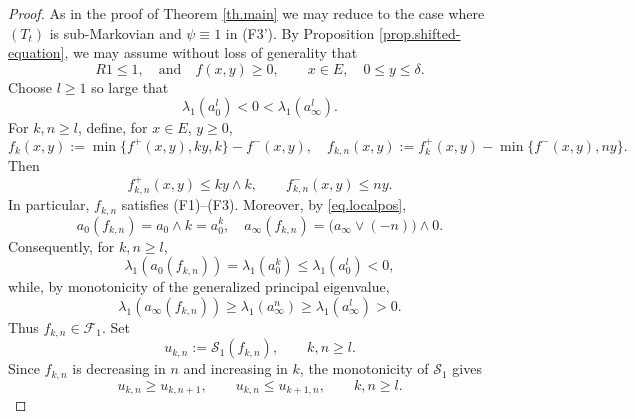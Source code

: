 \documentclass[11pt,a4paper,reqno]{amsart}
\theoremstyle{definition}
\numberwithin{equation}{section}
\begin{document}
\begin{proof}
As in the proof of Theorem \ref{th.main} we may reduce to the case where $(T_t)$ is sub-Markovian and
$\psi\equiv 1$ in (F3'). 
By Proposition \ref{prop.shifted-equation}, we may assume without
loss of generality that
\begin{equation}
\label{eq.localpos}
R1\le 1,\quad \text{and}\quad f(x,y)\ge0,
\qquad x\in E,\quad 0\le y\le\delta.
\end{equation}
Choose $l\ge1$ so large that
\begin{equation}
\label{eq.choose.l}
\lambda_1(a_0^l)<0<\lambda_1(a_\infty^l).
\end{equation}
For $k,n\ge l$, define, for $x\in E$, $y\ge 0$,
\begin{equation}
\label{eq.newfkn}
f_k(x,y)
:=
\min\{f^+(x,y),ky,k\}-f^-(x,y),\quad  f_{k,n}(x,y)
:=f^+_k(x,y)-\min\{f^-(x,y),ny\}.
\end{equation}
Then
\begin{equation}
\label{eq.estmt}
f_{k,n}^+(x,y)\le ky\wedge k,
\qquad
f_{k,n}^-(x,y)\le ny.
\end{equation}
In particular, $f_{k,n}$ satisfies \textup{(F1)--(F3)}.
Moreover, by \eqref{eq.localpos},
\[
a_0(f_{k,n})=a_0\wedge k=a_0^k,\quad a_\infty(f_{k,n})=\bigl(a_\infty\vee(-n)\bigr)\wedge0.
\]
Consequently, for $k,n\ge l$,
\[
\lambda_1(a_0(f_{k,n}))
=
\lambda_1(a_0^k)
\le \lambda_1(a_0^l)<0,
\]
while, by monotonicity of the generalized principal eigenvalue,
\[
\lambda_1(a_\infty(f_{k,n}))
\ge
\lambda_1(a_\infty^n)
\ge
\lambda_1(a_\infty^l)>0.
\]
Thus $f_{k,n}\in\mathscr F_1$.
Set
\[
u_{k,n}:=\mathcal S_1(f_{k,n}),
\qquad k,n\ge l.
\]
Since $f_{k,n}$ is decreasing in $n$ and increasing in $k$, the
monotonicity of $\mathcal S_1$ gives
\begin{equation}
\label{eq.newmon}
u_{k,n}\ge u_{k,n+1},
\qquad
u_{k,n}\le u_{k+1,n},
\qquad k,n\ge l.
\end{equation}


\end{proof}
\end{document}
